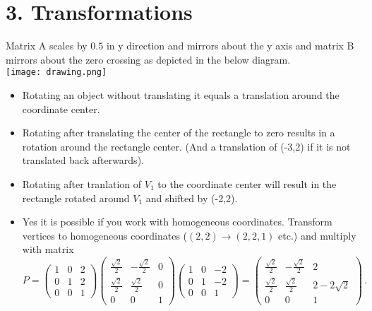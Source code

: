 \documentclass{article}
\begin{document}
\section*{3. Transformations} 


Matrix A scales by $0.5$ in y direction and mirrors about the y axis and matrix B mirrors about the zero crossing as depicted in the below diagram. \\
\texttt{[image: drawing.png]} \\

\begin{itemize}
\item Rotating an object without translating it equals a translation around the coordinate center.
\item Rotating after translating the center of the rectangle to zero results in a rotation around the rectangle center. (And a translation of (-3,2) if it is not translated back afterwards).
\item Rotating after tranlation of $V_1$ to the coordinate center will result in the rectangle rotated around $V_1$ and shifted by (-2,2).
\item Yes it is possible if you work with homogeneous coordinates. Transform vertices to homogeneous coordinates ($(2,2) \rightarrow (2,2,1)$ etc.) and multiply with matrix
\begin{equation*}
P = 
\begin{pmatrix}
1 & 0 &2\\
0 & 1 & 2\\
0 & 0 & 1
\end{pmatrix}
\begin{pmatrix}
\frac{\sqrt{2}}{2} & - \frac{\sqrt{2}}{2} & 0\\
\frac{\sqrt{2}}{2} &  \frac{\sqrt{2}}{2} & 0\\
0 & 0 & 1
\end{pmatrix}
\begin{pmatrix}
1 & 0 &-2\\
0 & 1 &-2\\
0 & 0 & 1
\end{pmatrix}=
\begin{pmatrix}
\frac{\sqrt{2}}{2} & - \frac{\sqrt{2}}{2} & 2\\
\frac{\sqrt{2}}{2} &  \frac{\sqrt{2}}{2} & 2-2\sqrt{2}\\
0 & 0 & 1
\end{pmatrix}\,.
\end{equation*}
\end{itemize}
\end{document}
